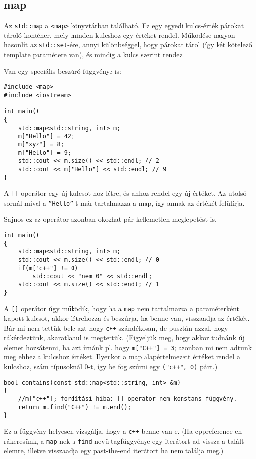 \documentclass[a4paper,11.5pt,table]{article}
\begin{document}
	\subsection{map}
	Az \texttt{std::map} a \texttt{<map>} könyvtárban található. Ez egy egyedi kulcs-érték párokat tároló konténer, mely minden kulcshoz egy értéket rendel. Működése nagyon hasonlít az \texttt{std::set}-ére, annyi különbséggel, hogy párokat tárol (így két kötelező template paramétere van), és mindig a kulcs szerint rendez.
	\smallskip
	
	Van egy speciális beszúró függvénye is:
\begin{lstlisting}
#include <map>
#include <iostream>

int main()
{
	std::map<std::string, int> m;
	m["Hello"] = 42;
	m["xyz"] = 8;
	m["Hello"] = 9;
	std::cout << m.size() << std::endl; // 2
	std::cout << m["Hello"] << std::endl; // 9
}
\end{lstlisting}
	A \texttt{[]} operátor egy új kulcsot hoz létre, és ahhoz rendel egy új értéket. Az utolsó sornál mivel a \texttt{''Hello''}-t már tartalmazza a map, így annak az értékét felülírja.
	
	\medskip
	Sajnos ez az operátor azonban okozhat pár kellemetlen meglepetést is.
	\begin{lstlisting}
int main()
{
	std::map<std::string, int> m;
	std::cout << m.size() << std::endl; // 0
	if(m["c++"] != 0)
		std::cout << "nem 0" << std::endl;
	std::cout << m.size() << std::endl; // 1
}
	\end{lstlisting}
	A \texttt{[]} operátor úgy működik, hogy ha a \texttt{map} nem tartalmazza a paraméterként kapott kulcsot, akkor létrehozza és beszúrja, ha benne van, visszaadja az értékét. Bár mi nem tettük bele azt hogy \texttt{c++} szándékosan, de pusztán azzal, hogy rákérdeztünk, akaratlanul is megtettük. (Figyeljük meg, hogy akkor tudnánk új elemet hozzátenni, ha azt írnánk pl. hogy \texttt{m["C++"] = 3}; azonban mi nem adtunk meg ehhez a kulcshoz értéket. Ilyenkor a map alapértelmezett értéket rendel a kulcshoz, szám típusoknál 0-t, így be fog szúrni egy \texttt{("c++", 0)} párt.)
	\begin{lstlisting}
bool contains(const std::map<std::string, int> &m)
{
	//m["c++"]; fordítási hiba: [] operator nem konstans függvény.
	return m.find("C++") != m.end();
}
	\end{lstlisting}
	Ez a függvény helyesen vizsgálja, hogy a \texttt{c++} benne van-e. (Ha cppreference-en rákeresünk, a \texttt{map}-nek a \texttt{find} nevű tagfüggvénye egy iterátort ad vissza a talált elemre, illetve visszaadja egy past-the-end iterátort ha nem találja meg.)
	\medskip
	
\end{document}
